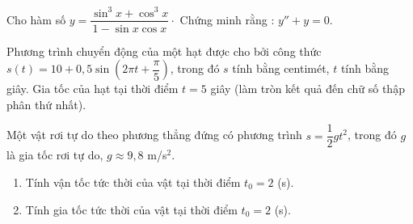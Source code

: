 \begin{bt}%
	Cho hàm số $y=\dfrac{\sin^3x+\cos^3x}{1-\sin x\cos x}\cdot $ Chứng minh rằng : ${y}''+y=0.$
\end{bt}
\begin{bt}%
	Phương trình chuyển động của một hạt được cho bởi công thức $s(t)=10+0{,}5\sin \left(2\pi t+\dfrac{\pi}{5}\right)$, trong đó $s$ tính bằng centimét, $t$ tính bằng giây. Gia tốc của hạt tại thời điểm $t=5$ giây (làm tròn kết quả đến chữ số thập phân thứ nhất).
\end{bt}
\begin{bt}%
	Một vật rơi tự do theo phương thẳng đứng có phương trình $ s=\dfrac{1}{2}gt^{2} $, trong đó $ g $ là gia tốc rơi tự do, $ g\approx 9,8 $ m/s$ ^{2} $.
	\begin{enumerate}
		\item Tính vận tốc tức thời của vật tại thời điểm $ t_{0}=2 $ (s).
		\item Tính gia tốc tức thời của vật tại thời điểm $ t_{0}=2 $ (s).
	\end{enumerate}
\end{bt}
